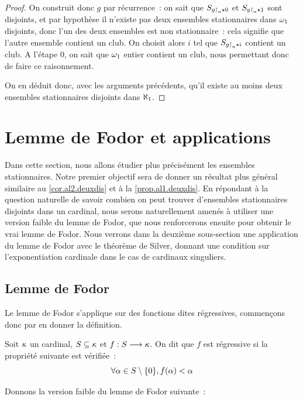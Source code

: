 \begin{proof}
  On construit donc $g$ par récurrence~: on sait que $S_{g\mathbin{\upharpoonright}_{n}\mathbin{\star} 0}$ et
  $S_{g\mathbin{\upharpoonright}_{n}\mathbin{\star} 1}$ sont disjoints, et par hypothèse il n'existe
  pas deux ensembles stationnaires dans $\omega_1$ disjoints, donc l'un des
  deux ensembles est non stationnaire~: cela signifie que l'autre ensemble
  contient un club. On choisit alors $i$ tel que $S_{g\mathbin{\upharpoonright}_{n} \mathbin{\star} i}$
  contient un club. A l'étape $0$, on sait que $\omega_1$ entier contient un
  club, nous permettant donc de faire ce raisonnement.

  On en déduit donc, avec les arguments précédents, qu'il existe au moins deux
  ensembles stationnaires disjoints dans $\aleph_1$.
\end{proof}

\section{Lemme de Fodor et applications}

Dans cette section, nous allons étudier plus précisément les ensembles
stationnaires. Notre premier objectif sera de donner un résultat plus général
similaire au \cref{cor.al2.deuxdis} et à la \cref{prop.al1.deuxdis}. En
répondant à la question naturelle de savoir combien on peut trouver d'ensembles
stationnaires disjoints dans un cardinal, nous serons naturellement amenés à
utiliser une version faible du lemme de Fodor, que nous renforcerons ensuite
pour obtenir le vrai lemme de Fodor. Nous verrons dans la deuxième sous-section
une application du lemme de Fodor avec le théorème de Silver, donnant une
condition sur l'exponentiation cardinale dans le cas de cardinaux singuliers.

\subsection{Lemme de Fodor}

Le lemme de Fodor s'applique sur des fonctions dites régressives, commençons
donc par en donner la définition.

\begin{definition}
  Soit $\kappa$ un cardinal, $S\subseteq \kappa$ et
  $f : \displaystyle S \longrightarrow \kappa$. On dit que $f$ est régressive si la
  propriété suivante est vérifiée~:
  \[\forall \alpha \in S\setminus\{0\}, f(\alpha) < \alpha\]
\end{definition}

Donnons la version faible du lemme de Fodor suivante~:

